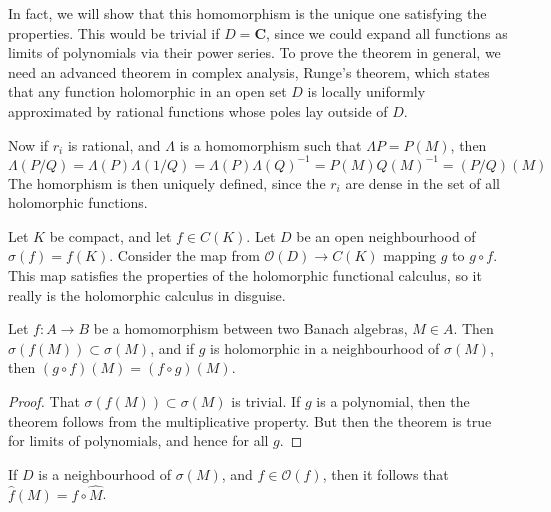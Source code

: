 In fact, we will show that this homomorphism is the unique one satisfying the properties. This would be trivial if $D = \mathbf{C}$, since we could expand all functions as limits of polynomials via their power series. To prove the theorem in general, we need an advanced theorem in complex analysis, Runge's theorem, which states that any function holomorphic in an open set $D$ is locally uniformly approximated by rational functions whose poles lay outside of $D$.

Now if $r_i$ is rational, and $\Lambda$ is a homomorphism such that $\Lambda P = P(M)$, then
%
\[ \Lambda (P/Q) = \Lambda(P) \Lambda(1/Q) = \Lambda(P) \Lambda(Q)^{-1} = P(M) Q(M)^{-1} = (P/Q)(M) \]
%
The homorphism is then uniquely defined, since the $r_i$ are dense in the set of all holomorphic functions.

\begin{example}
    Let $K$ be compact, and let $f \in C(K)$. Let $D$ be an open neighbourhood of $\sigma(f) = f(K)$. Consider the map from $\mathcal{O}(D) \to C(K)$ mapping $g$ to $g \circ f$. This map satisfies the properties of the holomorphic functional calculus, so it really is the holomorphic calculus in disguise.
\end{example}

\begin{theorem}
    Let $f:A \to B$ be a homomorphism between two Banach algebras, $M \in A$. Then $\sigma(f(M)) \subset \sigma(M)$, and if $g$ is holomorphic in a neighbourhood of $\sigma(M)$, then $(g \circ f)(M) = (f \circ g)(M)$.
\end{theorem}
\begin{proof}
    That $\sigma(f(M)) \subset \sigma(M)$ is trivial. If $g$ is a polynomial, then the theorem follows from the multiplicative property. But then the theorem is true for limits of polynomials, and hence for all $g$.
\end{proof}

\begin{corollary}
    If $D$ is a neighbourhood of $\sigma(M)$, and $f \in \mathcal{O}(f)$, then it follows that $\widehat{f}(M) = f \circ \widehat{M}$.
\end{corollary}

